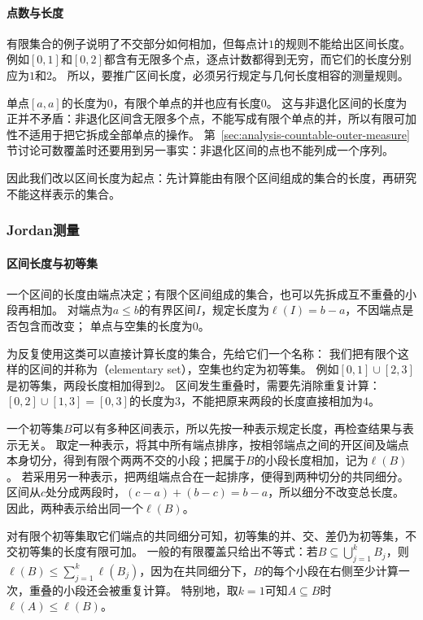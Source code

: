 \paragraph{点数与长度}

有限集合的例子说明了不交部分如何相加，但每点计$1$的规则不能给出区间长度。
例如$[0,1]$和$[0,2]$都含有无限多个点，逐点计数都得到无穷，而它们的长度分别应为$1$和$2$。
所以，要推广区间长度，必须另行规定与几何长度相容的测量规则。

单点$[a,a]$的长度为$0$，有限个单点的并也应有长度$0$。
这与非退化区间的长度为正并不矛盾：非退化区间含无限多个点，不能写成有限个单点的并，所以有限可加性不适用于把它拆成全部单点的操作。
第~\ref{sec:analysis-countable-outer-measure}节讨论可数覆盖时还要用到另一事实：非退化区间的点也不能列成一个序列。

因此我们改以区间长度为起点：先计算能由有限个区间组成的集合的长度，再研究不能这样表示的集合。

\subsubsection{Jordan测量}

\paragraph{区间长度与初等集}

一个区间的长度由端点决定；有限个区间组成的集合，也可以先拆成互不重叠的小段再相加。
对端点为$a\leq b$的有界区间$I$，规定长度为$\ell(I)=b-a$，不因端点是否包含而改变；
单点与空集的长度为$0$。

为反复使用这类可以直接计算长度的集合，先给它们一个名称：
我们把有限个这样的区间的并称为（elementary set），空集也约定为初等集。
例如$[0,1]\cup[2,3]$是初等集，两段长度相加得到$2$。
区间发生重叠时，需要先消除重复计算：$[0,2]\cup[1,3]=[0,3]$的长度为$3$，不能把原来两段的长度直接相加为$4$。

一个初等集$B$可以有多种区间表示，所以先按一种表示规定长度，再检查结果与表示无关。
取定一种表示，将其中所有端点排序，按相邻端点之间的开区间及端点本身切分，得到有限个两两不交的小段；把属于$B$的小段长度相加，记为$\ell(B)$。
若采用另一种表示，把两组端点合在一起排序，便得到两种切分的共同细分。
区间从$c$处分成两段时，$(c-a)+(b-c)=b-a$，所以细分不改变总长度。
因此，两种表示给出同一个$\ell(B)$。

对有限个初等集取它们端点的共同细分可知，初等集的并、交、差仍为初等集，不交初等集的长度有限可加。
一般的有限覆盖只给出不等式：若$B\subseteq\bigcup_{j=1}^k B_j$，则
$\ell(B)\leq\sum_{j=1}^k\ell(B_j)$，因为在共同细分下，$B$的每个小段在右侧至少计算一次，重叠的小段还会被重复计算。
特别地，取$k=1$可知$A\subseteq B$时$\ell(A)\leq\ell(B)$。

